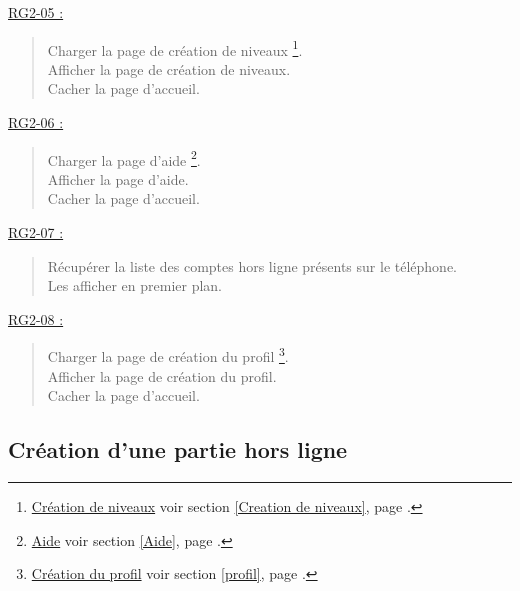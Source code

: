 \documentclass{report}
\begin{document}
		\underline{RG2-05 :}
			\begin{quote}
				Charger la page de création de niveaux%
					\footnote[6]{
						\hyperlink{Creation de niveaux}{Création de niveaux}
						\og voir section \ref{Creation de niveaux}, page \pageref{Creation de niveaux}.\fg
					}.\\
				Afficher la page de création de niveaux\footnotemark[6].\\
				Cacher la page d'accueil\footnotemark[2].\\		
			\end{quote}


		\underline{RG2-06 :}
			\begin{quote}
				Charger la page d'aide%
					\footnote[7]{
						\hyperlink{Aide}{Aide}
						\og voir section \ref{Aide}, page \pageref{Aide}.\fg
					}.\\
				Afficher la page d'aide\footnotemark[7].\\
				Cacher la page d'accueil\footnotemark[2].\\		
			\end{quote}
			
			
		\underline{RG2-07 :}
			\begin{quote}
				Récupérer la liste des comptes hors ligne présents sur le téléphone.\\
				Les afficher en premier plan.\\
			\end{quote}			


		\underline{RG2-08 :}
			\begin{quote}
				Charger la page de création du profil%
					\footnote[8]{
						\hyperlink{profil}{Création du profil}
						\og voir section \ref{profil}, page \pageref{profil}.\fg
					}.\\
				Afficher la page de création du profil\footnotemark[8].\\
				Cacher la page d'accueil\footnotemark[2].\\			
			\end{quote}

	
\newpage

	\subsection{Création d'une partie hors ligne}
	
		\hypertarget{Creer partie solo}{}
		\label{Creer partie solo}

		\begin{center}
					
		\end{center}
		
\end{document}
